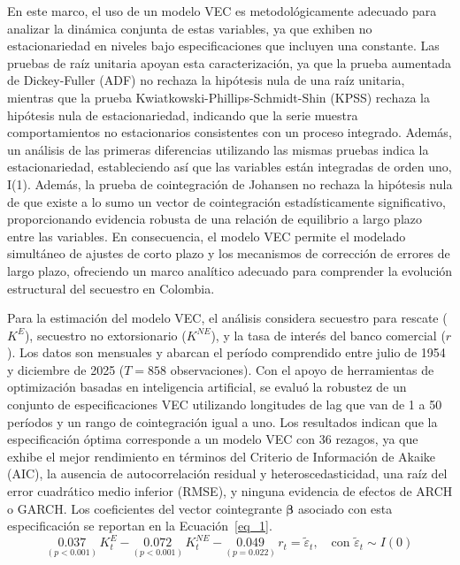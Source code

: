 \documentclass[12pt]{article}
\theoremstyle{definition}
\theoremstyle{remark}
\newcommand{\1}{\mathbf{1}}
\begin{document}
En este marco, el uso de un modelo VEC es metodológicamente adecuado para analizar la dinámica conjunta de estas variables, ya que exhiben no estacionariedad en niveles bajo especificaciones que incluyen una constante. Las pruebas de raíz unitaria apoyan esta caracterización, ya que la prueba aumentada de Dickey-Fuller (ADF) no rechaza la hipótesis nula de una raíz unitaria, mientras que la prueba Kwiatkowski-Phillips-Schmidt-Shin (KPSS) rechaza la hipótesis nula de estacionariedad, indicando que la serie muestra comportamientos no estacionarios consistentes con un proceso integrado. Además, un análisis de las primeras diferencias utilizando las mismas pruebas indica la estacionariedad, estableciendo así que las variables están integradas de orden uno, I(1). Además, la prueba de cointegración de Johansen no rechaza la hipótesis nula de que existe a lo sumo un vector de cointegración estadísticamente significativo, proporcionando evidencia robusta de una relación de equilibrio a largo plazo entre las variables. En consecuencia, el modelo VEC permite el modelado simultáneo de ajustes de corto plazo y los mecanismos de corrección de errores de largo plazo, ofreciendo un marco analítico adecuado para comprender la evolución estructural del secuestro en Colombia.


Para la estimación del modelo VEC, el análisis considera secuestro para rescate ($K^{E}$), secuestro no extorsionario ($K^{NE}$), y la tasa de interés del banco comercial ($r$). Los datos son mensuales y abarcan el período comprendido entre julio de 1954 y diciembre de 2025 ($T=858$ observaciones). Con el apoyo de herramientas de optimización basadas en inteligencia artificial, se evaluó la robustez de un conjunto de especificaciones VEC utilizando longitudes de lag que van de 1 a 50 períodos y un rango de cointegración igual a uno. Los resultados indican que la especificación óptima corresponde a un modelo VEC con 36 rezagos, ya que exhibe el mejor rendimiento en términos del Criterio de Información de Akaike (AIC), la ausencia de autocorrelación residual y heteroscedasticidad, una raíz del error cuadrático medio inferior (RMSE), y ninguna evidencia de efectos de ARCH o GARCH. Los coeficientes del vector cointegrante $\boldsymbol{\beta}$ asociado con esta especificación se reportan en la Ecuación~\ref{eq_1}.\\

\begin{equation}
\label{eq_1}
    \underset{(p < 0.001)}{0.037}\,K^{E}_t - \underset{(p < 0.001)}{0.072}\,K^{NE}_t - \underset{(p = 0.022)}{0.049}\,r_t = \tilde{\varepsilon}_t, \quad \text{con } \tilde{\varepsilon}_t \sim I(0)
\end{equation}
\end{document}
